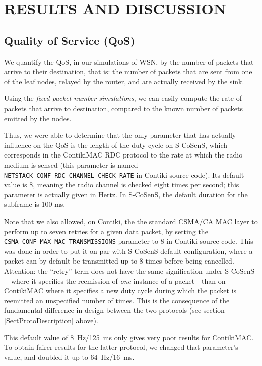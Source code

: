 \documentclass[a4paper,twoside]{article}
\begin{document}
\section{\uppercase{Results and Discussion}}

\subsection{Quality of Service (QoS)}

We quantify the QoS, in our simulations of WSN, by the number of packets
that arrive to their destination, that is: the number of packets that are
sent from one of the leaf nodes, relayed by the router, and are actually
received by the sink.

Using the \emph{fixed packet number simulations}, we can easily compute the
rate of packets that arrive to destination, compared to the known number
of packets emitted by the nodes.

Thus, we were able to determine that the only parameter that has actually
influence on the QoS is the length of the duty cycle on S-CoSenS, which
corresponds in the ContikiMAC RDC protocol to the rate at which the radio
medium is sensed (this parameter is named
\texttt{NETSTACK\_CONF\_RDC\_CHANNEL\_CHECK\_RATE} in Contiki source code).
Its default value is 8, meaning the radio channel is checked eight times
per second; this parameter is actually given in Hertz.
In S-CoSenS, the default duration for the subframe is 100 ms.

Note that we also allowed, on Contiki, the the standard CSMA/CA MAC layer
to perform up to seven retries for a given data packet, by setting the
\texttt{CSMA\_CONF\_MAX\_MAC\_TRANSMISSIONS}
parameter to 8 in Contiki source code. This was done in order to put it
on par with S-CoSenS default configuration, where a packet can by default
be transmitted up to 8 times before being cancelled.
Attention: the ``retry'' term does not have the same signification
under S-CoSenS---where it specifies the reemission of \emph{one} instance of
a packet---than on ContikiMAC where it specifies a new duty cycle during
which the packet is reemitted an unspecified number of times. This is
the consequence of the fundamental difference in design between the two
protocols (see section \ref{SectProtoDescription} above).

This default value of 8~Hz/125~ms only gives very poor results for ContikiMAC.
To obtain fairer results for the latter protocol, we changed that parameter's
value, and doubled it up to 64~Hz/16~ms.
\end{document}

